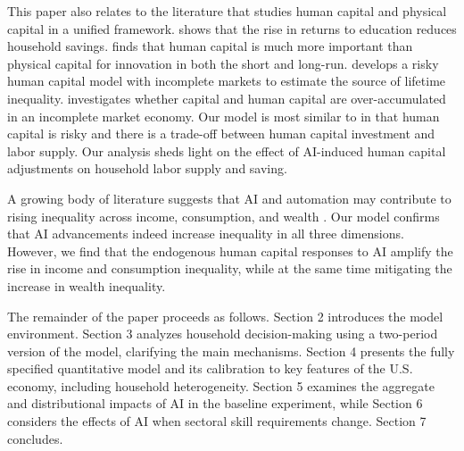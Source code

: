 \documentclass[12pt,english]{article}
\numberwithin{equation}{section}
\begin{document}
This paper also relates to the literature that studies human capital and physical capital in a unified framework. \citet{chanda_rise_2008} shows that the rise in returns to education reduces household savings. \citet{waldinger_bombs_2016} finds that human capital is much more important than physical capital for innovation in both the short and long-run. \citet{huggett_sources_2011} develops a risky human capital model with incomplete markets to estimate the source of lifetime inequality. \citet{park_constrained_2018} investigates whether capital and human capital are over-accumulated in an incomplete market economy. Our model is most similar to \citet{huggett_sources_2011} in that human capital is risky and there is a trade-off between human capital investment and labor supply. Our analysis sheds light on the effect of AI-induced human capital adjustments on household labor supply and saving.

A growing body of literature suggests that AI and automation may contribute to rising inequality across income, consumption, and wealth \citep[e.g.,][]{Sachs2012, berg_should_2018, Prettner2020, hemous_rise_2022}. Our model confirms that AI advancements indeed increase inequality in all three dimensions. However, we find that the endogenous human capital responses to AI amplify the rise in income and consumption inequality, while at the same time mitigating the increase in wealth inequality.


\vspace{1em}
\noindent
The remainder of the paper proceeds as follows. Section 2 introduces the model environment. Section 3 analyzes household decision-making using a two-period version of the model, clarifying the main mechanisms. Section 4 presents the fully specified quantitative model and its calibration to key features of the U.S. economy, including household heterogeneity. Section 5 examines the aggregate and distributional impacts of AI in the baseline experiment, while Section 6 considers the effects of AI when sectoral skill requirements change. Section 7 concludes.
\end{document}
